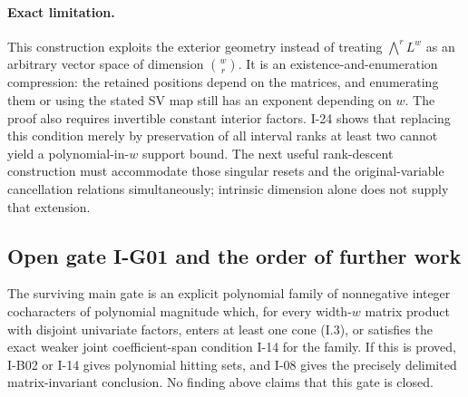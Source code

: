 \paragraph{Exact limitation.}
This construction exploits the exterior geometry instead of
treating $\bigwedge^r L^w$ as an arbitrary vector space of
dimension $\binom wr$.  It is an existence-and-enumeration
compression: the retained positions depend on the matrices,
and enumerating them or using the stated SV map still has an
exponent depending on $w$.  The proof also requires invertible
constant interior factors.  I-24 shows that replacing this
condition merely by preservation of all interval ranks at
least two cannot yield a polynomial-in-$w$ support bound.
The next useful rank-descent construction must accommodate
those singular resets and the original-variable cancellation
relations simultaneously; intrinsic dimension alone does
not supply that extension.


\subsection{Open gate I-G01 and the order of further work}
\label{I-G01}

The surviving main gate is an explicit polynomial family of
nonnegative integer cocharacters of polynomial magnitude which, for every
width-$w$ matrix product with disjoint univariate factors,
enters at least one cone (I.3), or satisfies the exact weaker joint
coefficient-span condition I-14 for the family.  If this is
proved, I-B02 or I-14 gives polynomial hitting sets, and I-08 gives the
precisely delimited matrix-invariant conclusion.  No finding
above claims that this gate is closed.

